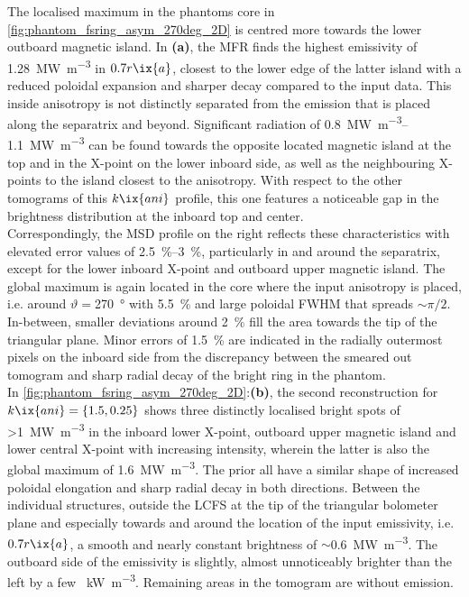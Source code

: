                 The localised maximum in the phantoms core in \cref{fig:phantom_fsring_asym_270deg_2D} is centred more towards the lower outboard magnetic island. In \textbf{(a)}, the MFR finds the highest emissivity of \SI{1.28}{\mega\watt\per\cubic\meter} in $0.7r\ix{a}$, closest to the lower edge of the latter island with a reduced poloidal expansion and sharper decay compared to the input data. This inside anisotropy is not distinctly separated from the emission that is placed along the separatrix and beyond. Significant radiation of \SIrange{0.8}{1.1}{\mega\watt\per\cubic\meter} can be found towards the opposite located magnetic island at the top and in the X-point on the lower inboard side, as well as the neighbouring X-points to the island closest to the anisotropy. With respect to the other tomograms of this $k\ix{ani}$ profile, this one features a noticeable gap in the brightness distribution at the inboard top and center.\\%
                Correspondingly, the MSD profile on the right reflects these characteristics with elevated error values of \SIrange{2.5}{3}{\percent}, particularly in and around the separatrix, except for the lower inboard X-point and outboard upper magnetic island. The global maximum is again located in the core where the input anisotropy is placed, i.e. around $\vartheta=$\SI{270}{\degree} with \SI{5.5}{\percent} and large poloidal FWHM that spreads $\sim\pi/2$. In-between, smaller deviations around \SI{2}{\percent} fill the area towards the tip of the triangular plane. Minor errors of \SI{1.5}{\percent} are indicated in the radially outermost pixels on the inboard side from the discrepancy between the smeared out tomogram  and sharp radial decay of the bright ring in the phantom.\\%
                In \cref{fig:phantom_fsring_asym_270deg_2D}:\textbf{(b)}, the second reconstruction for $k\ix{ani}=\left\{1.5, 0.25\right\}$ shows three distinctly localised bright spots of >\SI{1}{\mega\watt\per\cubic\meter} in the inboard lower X-point, outboard upper magnetic island and lower central X-point with increasing intensity, wherein the latter is also the global maximum of \SI{1.6}{\mega\watt\per\cubic\meter}. The prior all have a similar shape of increased poloidal elongation and sharp radial decay in both directions. Between the individual structures, outside the LCFS at the tip of the triangular bolometer plane and especially towards and around the location of the input emissivity, i.e. $0.7r\ix{a}$, a smooth and nearly constant brightness of $\sim$\SI{0.6}{\mega\watt\per\cubic\meter}. The outboard side of the emissivity is slightly, almost unnoticeably brighter than the left by a few \SI{}{\kilo\watt\per\cubic\meter}. Remaining areas in the tomogram are without emission.\\%
